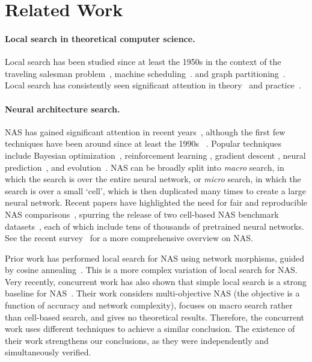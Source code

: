 \documentclass[11pt]{article}
\let\citep\cite
\numberwithin{equation}{section}
\numberwithin{figure}{section}
\theoremstyle{plain}
\theoremstyle{definition}
\begin{document}
 
\section{Related Work} \label{sec:related}

\paragraph{Local search in theoretical computer science.}
Local search has been studied since at least the 1950s in the context of the 
traveling salesman problem~\citep{bock1958algorithm, croes1958method},
machine scheduling~\citep{page1961approach}.
and graph partitioning~\citep{kernighan1970efficient}.
Local search has consistently seen significant attention in 
theory~\citep{aarts1997local, balcan2020k, johnson1988easy}
and practice~\citep{bentley1992fast, johnson1997traveling}.

\paragraph{Neural architecture search.}
NAS has gained significant attention in
recent years~\citep{zoph2017neural},
although the first few techniques have been around since at least the 1990s
~\citep{maziarz2018evolutionary, amoebanet}.
Popular techniques include
Bayesian optimization~\citep{nasbot, auto-keras}, 
reinforcement learning \citep{zoph2017neural, enas, pnas}, 
gradient descent \citep{darts},
neural prediction~\citep{bananas, shi2019multi},
and evolution~\citep{real2019regularized}.
NAS can be broadly split into \emph{macro} search, in which the search is
over the entire neural network, or \emph{micro} search, in which the search
is over a small `cell', which is then duplicated many times to create a
large neural network.
Recent papers have highlighted the need for fair and reproducible NAS 
comparisons~\citep{randomnas, lindauer2019best},
spurring the release of two cell-based 
NAS benchmark datasets~\citep{nasbench201,nasbench},
each of which include tens of thousands of pretrained neural networks.
See the recent survey~\citep{nas-survey} for a more comprehensive overview on NAS.


Prior work has performed local search for NAS using network morphisms, 
guided by cosine annealing~\citep{elsken2017simple}.
This is a more complex variation of local search for NAS.
Very recently, concurrent work has also shown that simple local search 
is a strong baseline for NAS~\citep{ottelander2020local}.
Their work considers multi-objective NAS
(the objective is a function of accuracy and network complexity),
focuses on macro search rather than cell-based search, 
and gives no theoretical results.
Therefore, the concurrent work uses different techniques to achieve a similar conclusion.
The existence of their work strengthens our conclusions, as they were independently
and simultaneously verified.
\end{document}
